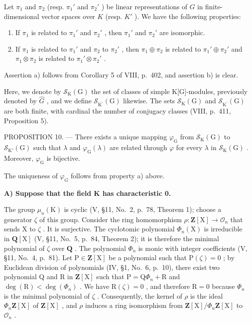 Let \(\pi_1\) and \(\pi_2\) (resp. \(\pi_1'\) and \(\pi_2'\) ) be linear representations of \(G\) in finite-dimensional vector spaces over \(K\) (resp. \(K'\) ). We have the following properties:

\begin{enumerate}
\def\labelenumi{\alph{enumi})}
\item
  If \(\pi_1\) is related to \(\pi_1'\) and \(\pi_2'\) , then \(\pi_1'\) and \(\pi_2'\) are isomorphic.
\item
  If \(\pi_1\) is related to \(\pi_1'\) and \(\pi_2\) to \(\pi_2'\) , then \(\pi_1 \oplus \pi_2\) is related to \(\pi_1' \oplus \pi_2'\) and \(\pi_1 \otimes \pi_2\) is related to \(\pi_1' \otimes \pi_2'\) .
\end{enumerate}

Assertion a) follows from Corollary 5 of VIII, p.~402, and assertion b) is clear.

Here, we denote by \(\mathcal{S}_{\mathrm{K}}(\mathrm{G})\) the set of classes of simple K{[}G{]}-modules, previously denoted by \(\widehat{G}\) , and we define \(\mathcal{S}_{\mathrm{K}^{\prime}}(\mathrm{G})\) likewise. The sets \(\mathcal{S}_{\mathrm{K}}(\mathrm{G})\) and \(\mathcal{S}_{\mathrm{K}^{\prime}}(\mathrm{G})\) are both finite, with cardinal the number of conjugacy classes (VIII, p.~411, Proposition 5).

PROPOSITION 10. --- There exists a unique mapping \(\varphi_{\mathrm{G}}\) from \(\mathcal{S}_{\mathrm{K}}(\mathrm{G})\) to \(\mathcal{S}_{\mathrm{K}'}(\mathrm{G})\) such that \(\lambda\) and \(\varphi_{\mathrm{G}}(\lambda)\) are related through \(\varphi\) for every \(\lambda\) in \(\mathcal{S}_{\mathrm{K}}(\mathrm{G})\) . Moreover, \(\varphi_{\mathrm{G}}\) is bijective.

The uniqueness of \(\varphi_{G}\) follows from property a) above.

\textbf{A) Suppose that the field K has characteristic 0.}

The group \(\mu_n(\mathrm{K})\) is cyclic (V, §11, No.~2, p.~78, Theorem 1); choose a generator \(\zeta\) of this group. Consider the ring homomorphism \(\rho: \mathbf{Z}[\mathrm{X}] \to \mathcal{O}_n\) that sends X to \(\zeta\) . It is surjective. The cyclotomic polynomial \(\Phi_n(\mathrm{X})\) is irreducible in \(\mathbf{Q}[\mathrm{X}]\) (V, §11, No.~5, p.~84, Theorem 2); it is therefore the minimal polynomial of \(\zeta\) over \(\mathbf{Q}\) . The polynomial \(\Phi_n\) is monic with integer coefficients (V, §11, No.~4, p.~81). Let \(\mathrm{P} \in \mathbf{Z}[\mathrm{X}]\) be a polynomial such that \(\mathrm{P}(\zeta) = 0\) ; by Euclidean division of polynomials (IV, §1, No.~6, p.~10), there exist two polynomial Q and R in \(\mathbf{Z}[\mathrm{X}]\) such that \(\mathrm{P} = \mathrm{Q}\Phi_n + \mathrm{R}\) and \(\deg(\mathrm{R}) < \deg(\Phi_n)\) . We have \(\mathrm{R}(\zeta) = 0\) , and therefore \(\mathrm{R} = 0\) because \(\Phi_n\) is the minimal polynomial of \(\zeta\) . Consequently, the kernel of \(\rho\) is the ideal \(\Phi_n\mathbf{Z}[\mathrm{X}]\) of \(\mathbf{Z}[\mathrm{X}]\) , and \(\rho\) induces a ring isomorphism from \(\mathbf{Z}[\mathrm{X}] / \Phi_n\mathbf{Z}[\mathrm{X}]\) to \(\mathcal{O}_n\) .

